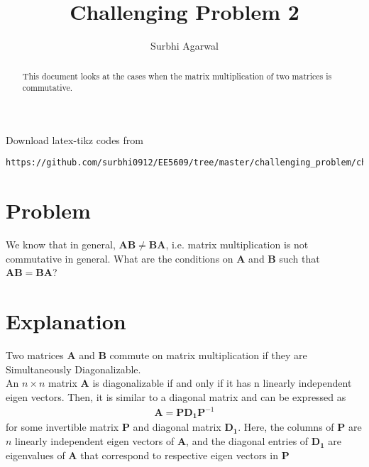 \documentclass[journal,12pt,twocolumn]{IEEEtran}
\begin{document}
\let\StandardTheFigure\thefigure
\let\vec\mathbf

\renewcommand{\thefigure}{\theproblem}

\def\putbox#1#2#3{\makebox[0in][l]{\makebox[#1][l]{}\raisebox{\baselineskip}[0in][0in]{\raisebox{#2}[0in][0in]{#3}}}}
     \def\rightbox#1{\makebox[0in][r]{#1}}
     \def\centbox#1{\makebox[0in]{#1}}
     \def\topbox#1{\raisebox{-\baselineskip}[0in][0in]{#1}}
     \def\midbox#1{\raisebox{-0.5\baselineskip}[0in][0in]{#1}}
\vspace{3cm}

\title{Challenging Problem 2}
\author{Surbhi Agarwal}

\maketitle

\newpage


\bigskip

\renewcommand{\thefigure}{\theenumi}
\renewcommand{\thetable}{\theenumi}

\begin{abstract}
This document looks at the cases when the matrix multiplication of two matrices is commutative.
\end{abstract}

Download latex-tikz codes from 
%
\begin{lstlisting}
https://github.com/surbhi0912/EE5609/tree/master/challenging_problem/challenging2
\end{lstlisting}
%
\section{Problem}
We know that in general, $\vec{A}\vec{B} \ne \vec{B}\vec{A}$, i.e. matrix multiplication is not commutative in general. What are the conditions on $\vec{A}$ and $\vec{B}$ such that $\vec{A}\vec{B} = \vec{B}\vec{A}$?

\section{Explanation}
Two matrices $\vec{A}$ and $\vec{B}$ commute on matrix multiplication if they are Simultaneously Diagonalizable.\\

An $n\times n$ matrix $\vec{A}$ is diagonalizable if and only if it has n linearly independent eigen vectors. Then, it is similar to a diagonal matrix and can be expressed as
\begin{align}\label{eq1}
    \vec{A} = \vec{P}\vec{D_1}\vec{P}^{-1}
\end{align}
for some invertible matrix $\vec{P}$ and diagonal matrix $\vec{D_1}$. Here, the columns of $\vec{P}$ are $n$ linearly independent eigen vectors of $\vec{A}$, and the diagonal entries of $\vec{D_1}$ are eigenvalues of $\vec{A}$ that correspond to respective eigen vectors in $\vec{P}$\\
\end{document}
